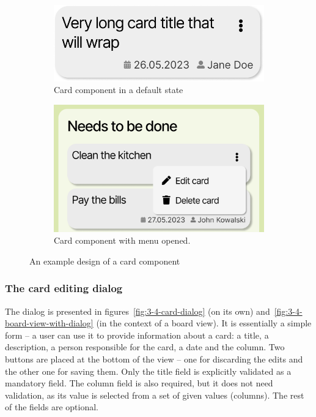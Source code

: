 \begin{figure}
    \centering
    \begin{subfigure}[m]{0.45\textwidth}
        \centering
        \includegraphics[width=\textwidth]{./3-research-methodology/card-component}
        \caption{Card component in a default state}
        \label{fig:3-4-card-component-plain}
    \end{subfigure}
    \hfill
    \begin{subfigure}[m]{0.45\textwidth}
        \centering
        \includegraphics[width=\textwidth]{./3-research-methodology/card-component-with-menu}
        \caption{Card component with menu opened.}
        \label{fig:3-4-card-component-with-menu}
    \end{subfigure}
    \caption{An example design of a card component}
    \label{fig:3-4-card-component}
\end{figure}

\subsubsection{The card editing dialog}
The dialog is presented in figures~\ref{fig:3-4-card-dialog} (on its own) and~\ref{fig:3-4-board-view-with-dialog} (in the context of a board view).
It is essentially a simple form -- a user can use it to provide information about a card: a title, a description, a person responsible for the card, a date and the column.
Two buttons are placed at the bottom of the view -- one for discarding the edits and the other one for saving them.
Only the title field is explicitly validated as a mandatory field.
The column field is also required, but it does not need validation, as its value is selected from a set of given values (columns).
The rest of the fields are optional.

